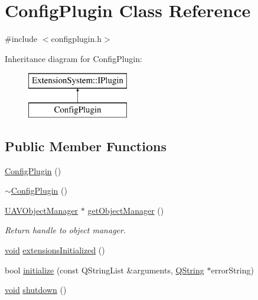 \hypertarget{class_config_plugin}{\section{\-Config\-Plugin \-Class \-Reference}
\label{class_config_plugin}
}


{\ttfamily \#include $<$configplugin.\-h$>$}

\-Inheritance diagram for \-Config\-Plugin\-:\begin{figure}[H]
\begin{center}
\leavevmode
\includegraphics[height=2.000000cm]{class_config_plugin}
\end{center}
\end{figure}
\subsection*{\-Public \-Member \-Functions}
\begin{DoxyCompactItemize}
\item 
\hyperlink{group___config_plugin_ga7d360f4053aa997f911f4b8d5b9beddc}{\-Config\-Plugin} ()
\item 
\hyperlink{group___config_plugin_gabe1cf1e86b64f31b77b147614d70cb2d}{$\sim$\-Config\-Plugin} ()
\item 
\hyperlink{class_u_a_v_object_manager}{\-U\-A\-V\-Object\-Manager} $\ast$ \hyperlink{group___config_plugin_ga4b72a360021dcddf63bd9dc3566930bf}{get\-Object\-Manager} ()
\begin{DoxyCompactList}\small\item\em \-Return handle to object manager. \end{DoxyCompactList}\item 
\hyperlink{group___u_a_v_objects_plugin_ga444cf2ff3f0ecbe028adce838d373f5c}{void} \hyperlink{group___config_plugin_gabbca0b710aa7b4870df57f979e248833}{extensions\-Initialized} ()
\item 
bool \hyperlink{group___config_plugin_ga6caac2a6d708537fbabed44ad35e694f}{initialize} (const \-Q\-String\-List \&arguments, \hyperlink{group___u_a_v_objects_plugin_gab9d252f49c333c94a72f97ce3105a32d}{\-Q\-String} $\ast$error\-String)
\item 
\hyperlink{group___u_a_v_objects_plugin_ga444cf2ff3f0ecbe028adce838d373f5c}{void} \hyperlink{group___config_plugin_gaf7af8833b63795f7bb96fd43bf74fb3e}{shutdown} ()
\end{DoxyCompactItemize}


